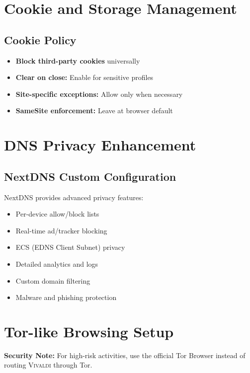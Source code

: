 \documentclass[11pt,a4paper,oneside]{book}
\newcommand{\vivaldi}{\textsc{Vivaldi}}
\begin{document}
\section{Cookie and Storage Management}

\subsection{Cookie Policy}

\begin{itemize}
    \item \textbf{Block third-party cookies} universally
    \item \textbf{Clear on close:} Enable for sensitive profiles
    \item \textbf{Site-specific exceptions:} Allow only when necessary
    \item \textbf{SameSite enforcement:} Leave at browser default
\end{itemize}

\section{DNS Privacy Enhancement}

\subsection{NextDNS Custom Configuration}

NextDNS provides advanced privacy features:

\begin{multicols}{2}
\begin{itemize}
    \item Per-device allow/block lists
    \item Real-time ad/tracker blocking
    \item ECS (EDNS Client Subnet) privacy
    \item Detailed analytics and logs
    \item Custom domain filtering
    \item Malware and phishing protection
\end{itemize}
\end{multicols}

\section{Tor-like Browsing Setup}

\begin{warningbox}
\textbf{Security Note:} For high-risk activities, use the official Tor Browser instead of routing \vivaldi{} through Tor.
\end{warningbox}
\end{document}
